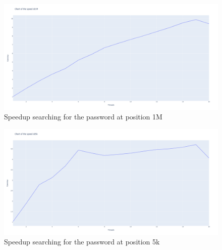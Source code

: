 \documentclass[10pt,twocolumn,letterpaper]{article}
\begin{document}
    \begin{figure}
    \begin{center}
    \includegraphics[width=1.0\linewidth]{./img/speedup.png}
    \end{center}
        \caption{Speedup searching for the password at position 1M}
    \label{fig:speedup}
    \end{figure}

    \begin{figure}
    \begin{center}
    \includegraphics[width=1.0\linewidth]{./img/speedup-5k.png}
    \end{center}
        \caption{Speedup searching for the password at position 5k}
    \label{fig:speedup-5k}
    \end{figure}

\clearpage

\nocite{*}
\twocolumn


\onecolumn
\end{document}
